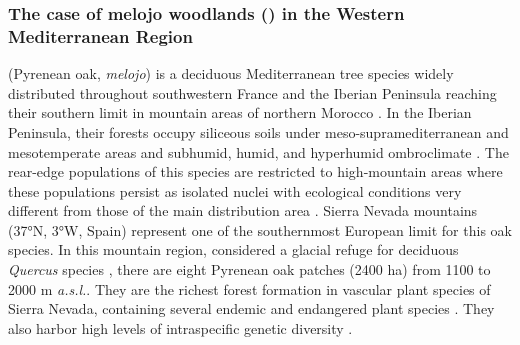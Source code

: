 \subsubsection{The case of melojo woodlands (\Qpy) in the Western Mediterranean Region}\label{sec:es:intro-qp}
\Qpw (Pyrenean oak, \emph{melojo}) is a deciduous Mediterranean tree species widely distributed throughout southwestern France and the Iberian Peninsula reaching their southern limit in mountain areas of northern Morocco \autocites{Franco1990Quercus}. In the Iberian Peninsula, their forests occupy siliceous soils under meso-supramediterranean and mesotemperate areas and subhumid, humid, and hyperhumid ombroclimate \autocites{delaSernaetal2016MarcescentQuercus,Gavilanetal2018SclerophyllousDeciduous}. The rear-edge populations of this species are restricted to high-mountain areas where these populations persist as isolated nuclei with ecological conditions very different from those of the main distribution area \autocites{PerezLuqueetal2021EcologicalDiversity}. Sierra Nevada  mountains (37°N, 3°W, Spain) represent one of the southernmost European limit for this oak species. In this mountain region, considered a glacial refuge for deciduous \emph{Quercus} species \autocite{Olaldeetal2002WhiteOaks}, there are eight Pyrenean oak patches (2400 ha) from 1100 to 2000 m \emph{a.s.l.}. They are the richest forest formation in vascular plant species of Sierra Nevada, containing several endemic and endangered plant species \autocite{Loriteetal2008PhytosociologicalReview}. They also harbor high levels of intraspecific genetic diversity \autocite{ValbuenaCarabanaGil2013GeneticResilience,ValbuenaCarabanaGil2017CentenaryCoppicing}. 

